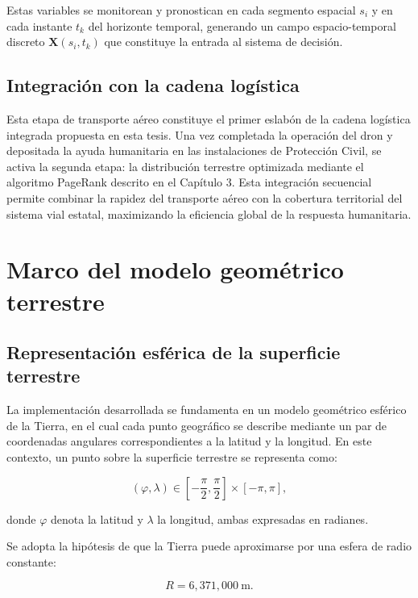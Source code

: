 \documentclass[
  spanish,
  us-letterpaper,
]{scrreprt}
\numberwithin{equation}{section}
\begin{document}
Estas variables se monitorean y pronostican en cada segmento espacial
\(s_i\) y en cada instante \(t_k\) del horizonte temporal, generando un
campo espacio-temporal discreto \(\mathbf{X}(s_i, t_k)\) que constituye
la entrada al sistema de decisión.

\subsection{Integración con la cadena
logística}\label{integraciuxf3n-con-la-cadena-loguxedstica}

Esta etapa de transporte aéreo constituye el primer eslabón de la cadena
logística integrada propuesta en esta tesis. Una vez completada la
operación del dron y depositada la ayuda humanitaria en las
instalaciones de Protección Civil, se activa la segunda etapa: la
distribución terrestre optimizada mediante el algoritmo PageRank
descrito en el Capítulo 3. Esta integración secuencial permite combinar
la rapidez del transporte aéreo con la cobertura territorial del sistema
vial estatal, maximizando la eficiencia global de la respuesta
humanitaria.

\section{Marco del modelo geométrico
terrestre}\label{marco-del-modelo-geomuxe9trico-terrestre}

\subsection{Representación esférica de la superficie
terrestre}\label{representaciuxf3n-esfuxe9rica-de-la-superficie-terrestre}

La implementación desarrollada se fundamenta en un modelo geométrico
esférico de la Tierra, en el cual cada punto geográfico se describe
mediante un par de coordenadas angulares correspondientes a la latitud y
la longitud. En este contexto, un punto sobre la superficie terrestre se
representa como:

\[
(\varphi, \lambda) \in \left[-\frac{\pi}{2}, \frac{\pi}{2}\right] \times [-\pi, \pi],
\]

donde \(\varphi\) denota la latitud y \(\lambda\) la longitud, ambas
expresadas en radianes.

Se adopta la hipótesis de que la Tierra puede aproximarse por una esfera
de radio constante:

\[
R = 6,\!371,\!000 \ \text{m}.
\]
\end{document}
